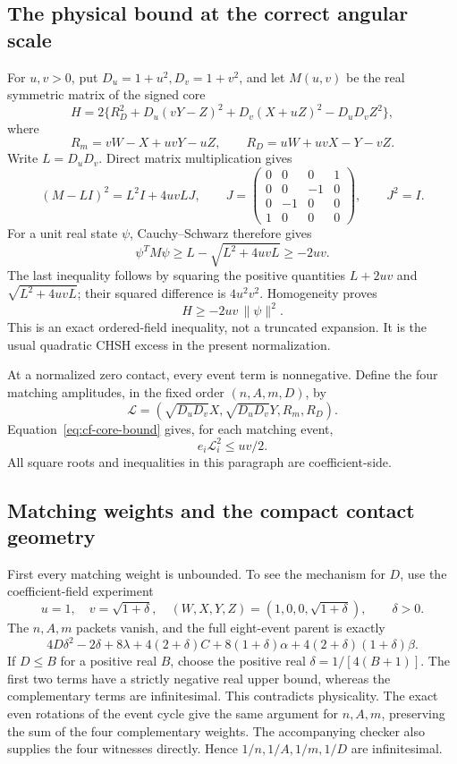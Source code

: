 \subsection{The physical bound at the correct angular scale}
For \(u,v>0\), put \(D_u=1+u^2,D_v=1+v^2\), and let \(M(u,v)\) be the
real symmetric matrix of the signed core
\[
H=2\{R_D^2+D_u(vY-Z)^2+D_v(X+uZ)^2-D_uD_vZ^2\},
\]
where
\[
R_m=vW-X+uvY-uZ,\qquad R_D=uW+uvX-Y-vZ.
\]
Write \(L=D_uD_v\). Direct matrix multiplication gives
\begin{equation}
(M-LI)^2=L^2I+4uvLJ,\qquad
J=\begin{pmatrix}0&0&0&1\\0&0&-1&0\\0&-1&0&0\\1&0&0&0\end{pmatrix},
\qquad J^2=I.                                      \label{eq:cf-core-square}
\end{equation}
For a unit real state \(\psi\), Cauchy--Schwarz therefore gives
\[
\psi^TM\psi\ge L-\sqrt{L^2+4uvL}\ge-2uv.
\]
The last inequality follows by squaring the positive quantities
\(L+2uv\) and \(\sqrt{L^2+4uvL}\); their squared difference is
\(4u^2v^2\). Homogeneity proves
\begin{equation}
                         H\ge-2uv\,\|\psi\|^2.        \label{eq:cf-core-bound}
\end{equation}
This is an exact ordered-field inequality, not a truncated expansion.
It is the usual quadratic CHSH excess in the present normalization.

At a normalized zero contact, every event term is nonnegative. Define
the four matching amplitudes, in the fixed order \((n,A,m,D)\), by
\[
\mathcal L=(\sqrt{D_uD_v}X,\sqrt{D_uD_v}Y,R_m,R_D).
\]
Equation~\eqref{eq:cf-core-bound} gives, for each matching event,
\begin{equation}
                   e_i\mathcal L_i^2\le uv/2.         \label{eq:cf-amplitude-bound}
\end{equation}
All square roots and inequalities in this paragraph are coefficient-side.

\subsection{Matching weights and the compact contact geometry}
First every matching weight is unbounded. To see the mechanism for
\(D\), use the coefficient-field experiment
\[
 u=1,\quad v=\sqrt{1+\delta},\quad
 (W,X,Y,Z)=(1,0,0,\sqrt{1+\delta}),\qquad\delta>0.
\]
The \(n,A,m\) packets vanish, and the full eight-event parent is exactly
\[
4D\delta^2-2\delta+8\lambda+4(2+\delta)C
 +8(1+\delta)\alpha+4(2+\delta)(1+\delta)\beta.
\]
If \(D\le B\) for a positive real \(B\), choose the positive real
\(\delta=1/[4(B+1)]\). The first two terms have a strictly negative
real upper bound, whereas the complementary terms are infinitesimal.
This contradicts physicality. The exact even rotations of the event
cycle give the same argument for \(n,A,m\), preserving the sum of the
four complementary weights. The accompanying checker also supplies
the four witnesses directly. Hence \(1/n,1/A,1/m,1/D\) are infinitesimal.

